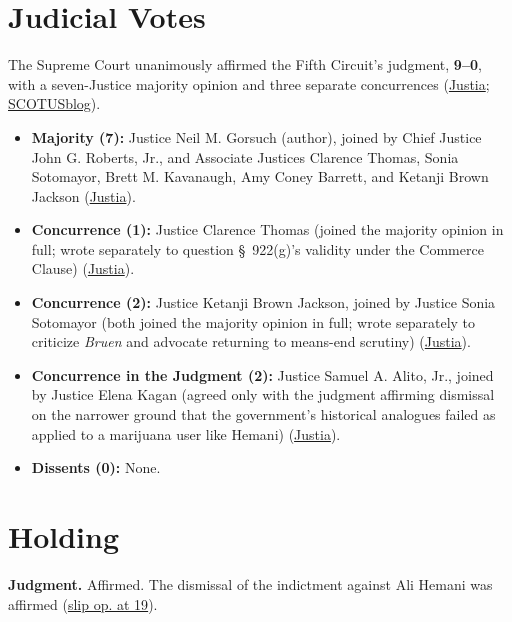 \documentclass[12pt]{article}
\begin{document}
\section{Judicial Votes}

The Supreme Court unanimously affirmed the Fifth Circuit's judgment, \textbf{9--0}, with a seven-Justice majority opinion and three separate concurrences (\href{https://supreme.justia.com/cases/federal/us/608/24-1234/}{Justia}; \href{https://www.scotusblog.com/cases/united-states-v-hemani/}{SCOTUSblog}).

\begin{itemize}
\item \textbf{Majority (7):} Justice Neil M. Gorsuch (author), joined by Chief Justice John G. Roberts, Jr., and Associate Justices Clarence Thomas, Sonia Sotomayor, Brett M. Kavanaugh, Amy Coney Barrett, and Ketanji Brown Jackson (\href{https://supreme.justia.com/cases/federal/us/608/24-1234/}{Justia}).
\item \textbf{Concurrence (1):} Justice Clarence Thomas (joined the majority opinion in full; wrote separately to question \S~922(g)'s validity under the Commerce Clause) (\href{https://supreme.justia.com/cases/federal/us/608/24-1234/}{Justia}).
\item \textbf{Concurrence (2):} Justice Ketanji Brown Jackson, joined by Justice Sonia Sotomayor (both joined the majority opinion in full; wrote separately to criticize \textit{Bruen} and advocate returning to means-end scrutiny) (\href{https://supreme.justia.com/cases/federal/us/608/24-1234/}{Justia}).
\item \textbf{Concurrence in the Judgment (2):} Justice Samuel A. Alito, Jr., joined by Justice Elena Kagan (agreed only with the judgment affirming dismissal on the narrower ground that the government's historical analogues failed as applied to a marijuana user like Hemani) (\href{https://supreme.justia.com/cases/federal/us/608/24-1234/}{Justia}).
\item \textbf{Dissents (0):} None.
\end{itemize}

\section{Holding}

\textbf{Judgment.} Affirmed. The dismissal of the indictment against Ali Hemani was affirmed (\href{https://supreme.justia.com/cases/federal/us/608/24-1234/}{slip op. at 19}).
\end{document}
